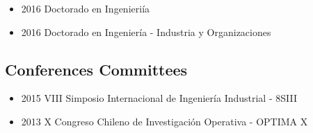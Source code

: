 {\begin{itemize}
    \item 2016 Doctorado en Ingenieri\'ia
\end{itemize}
}

{\begin{itemize}
    \item 2016 Doctorado en Ingenier\'ia - Industria y Organizaciones
\end{itemize}
}

\clearpage

\subsection{Conferences Committees}

{\begin{itemize}
    \item 2015 VIII Simposio Internacional de Ingenier\'ia Industrial - 8SIII
    \item 2013 X Congreso Chileno de Investigaci\'on Operativa - OPTIMA X
\end{itemize}
}


